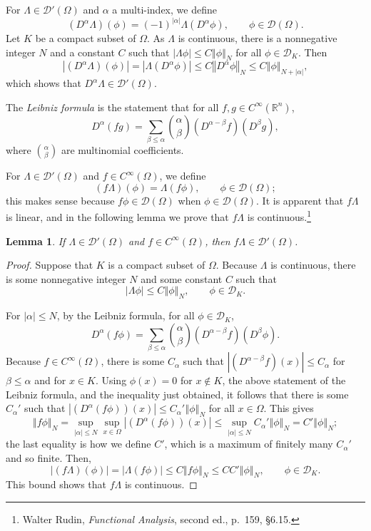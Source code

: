 \documentclass{article}
\newcommand{\norm}[1]{\left\Vert #1 \right\Vert}
\newtheorem{lemma}[theorem]{Lemma}
\theoremstyle{definition}
\begin{document}
For $\Lambda \in \mathscr{D}'(\Omega)$ and $\alpha$ a multi-index,
 we define
\[
(D^\alpha \Lambda)(\phi) = (-1)^{|\alpha|} \Lambda(D^\alpha \phi), \qquad \phi \in \mathscr{D}(\Omega).
\]
Let $K$ be a compact subset of $\Omega$. As $\Lambda$ is continuous, there is a nonnegative integer $N$ and a constant
$C$ such that $|\Lambda \phi| \leq C \norm{\phi}_N$ for all $\phi \in \mathscr{D}_K$. Then
\[
|(D^\alpha \Lambda)(\phi)| = |\Lambda(D^\alpha \phi)| \leq C \norm{D^\alpha \phi}_N \leq C \norm{\phi}_{N+|\alpha|},
\]
which shows that $D^\alpha \Lambda \in \mathscr{D}'(\Omega)$. 


 The {\em Leibniz formula} is the statement that 
for all $f,g \in C^\infty(\mathbb{R}^n)$,  
\[
D^\alpha(fg) = \sum_{\beta \leq \alpha} \binom{\alpha}{\beta} (D^{\alpha-\beta}f)(D^\beta g),
\]
where $\binom{\alpha}{\beta}$ are multinomial coefficients.

For $\Lambda \in \mathscr{D}'(\Omega)$ and $f \in C^\infty(\Omega)$, we define 
\[
(f\Lambda)(\phi) = \Lambda(f\phi), \qquad \phi \in \mathscr{D}(\Omega);
\]
this makes sense because $f\phi \in \mathscr{D}(\Omega)$ when $\phi \in \mathscr{D}(\Omega)$. It is apparent that $f\Lambda$
is linear, and in the following lemma we prove that $f\Lambda$ is continuous.\footnote{Walter
Rudin, {\em Functional Analysis}, second ed., p.~159, \S 6.15.}

\begin{lemma}
If $\Lambda \in \mathscr{D}'(\Omega)$ and $f \in C^\infty(\Omega)$, then $f \Lambda \in \mathscr{D}'(\Omega)$.
\label{module}
\end{lemma}
\begin{proof}
Suppose that $K$ is a compact subset of $\Omega$. Because $\Lambda$ is continuous, 
there is some nonnegative integer $N$ and some constant $C$ such that
\[
|\Lambda \phi| \leq C \norm{\phi}_N, \qquad \phi \in \mathscr{D}_K.
\]

For $|\alpha| \leq N$, by the Leibniz formula, for all
$\phi \in \mathscr{D}_K$,
\[
D^\alpha(f\phi) = \sum_{\beta \leq \alpha} \binom{\alpha}{\beta} (D^{\alpha-\beta}f)(D^\beta \phi).
\]
Because $f \in C^\infty(\Omega)$, there is some $C_{\alpha}$ such that $|(D^{\alpha-\beta}f)(x)| \leq C_{\alpha}$ for $\beta \leq \alpha$ and for $x \in K$. 
Using $\phi(x)=0$ for $x \not \in K$,  the above statement of the Leibniz formula, and  the inequality
just obtained,
it follows that there is some $C_{\alpha}'$ such that $|(D^\alpha(f\phi))(x)| \leq C_{\alpha}' \norm{\phi}_N$ for all $x \in \Omega$.
This gives
\[
\norm{f\phi}_N=\sup_{|\alpha| \leq N} \sup_{x \in \Omega} |(D^\alpha (f\phi))(x)|
\leq
\sup_{|\alpha| \leq N} C_{\alpha}' \norm{\phi}_N=C'\norm{\phi}_N;
\]
the last equality is how we define $C'$, which is a maximum of finitely many $C_\alpha'$ and so finite.
Then,
\[
|(f\Lambda)(\phi)| = |\Lambda(f\phi)| \leq C \norm{f\phi}_N \leq CC'\norm{\phi}_N, \qquad \phi \in \mathscr{D}_K.
\]
This bound shows that $f\Lambda$ is continuous.
\end{proof}
\end{document}
